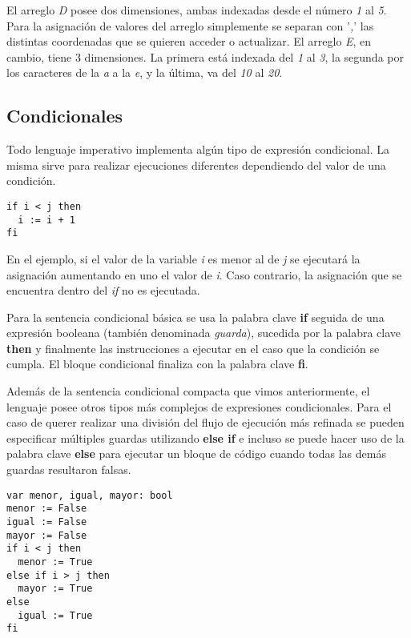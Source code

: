 \documentclass{article}
\begin{document}
El arreglo \textit{D} posee dos dimensiones, ambas indexadas desde el número \textit{1} al \textit{5}.
Para la asignación de valores del arreglo simplemente se separan con '\textit{,}' las distintas coordenadas que se quieren acceder o actualizar.
El arreglo \textit{E}, en cambio, tiene 3 dimensiones.
La primera está indexada del \textit{1} al \textit{3}, la segunda por los caracteres de la \textit{a} a la \textit{e}, y la última, va del \textit{10} al \textit{20}.

\subsection{Condicionales}

Todo lenguaje imperativo implementa algún tipo de expresión condicional.
La misma sirve para realizar ejecuciones diferentes dependiendo del valor de una condición.

\begin{lstlisting}
if i < j then
  i := i + 1
fi
\end{lstlisting}

En el ejemplo, si el valor de la variable \textit{i} es menor al de \textit{j} se ejecutará la asignación aumentando en uno el valor de \textit{i}.
Caso contrario, la asignación que se encuentra dentro del \textit{if} no es ejecutada.

Para la sentencia condicional básica se usa la palabra clave \textbf{if} seguida de una expresión booleana (también denominada \textit{guarda}), sucedida por la palabra clave \textbf{then} y finalmente las instrucciones a ejecutar en el caso que la condición se cumpla.
El bloque condicional finaliza con la palabra clave \textbf{fi}.

Además de la sentencia condicional compacta que vimos anteriormente, el lenguaje posee otros tipos más complejos de expresiones condicionales.
Para el caso de querer realizar una división del flujo de ejecución más refinada se pueden especificar múltiples guardas utilizando \textbf{else if} e incluso se puede hacer uso de la palabra clave \textbf{else} para ejecutar un bloque de código cuando todas las demás guardas resultaron falsas.

\begin{lstlisting}
var menor, igual, mayor: bool
menor := False
igual := False
mayor := False
if i < j then
  menor := True
else if i > j then
  mayor := True
else
  igual := True
fi
\end{lstlisting}
\end{document}
